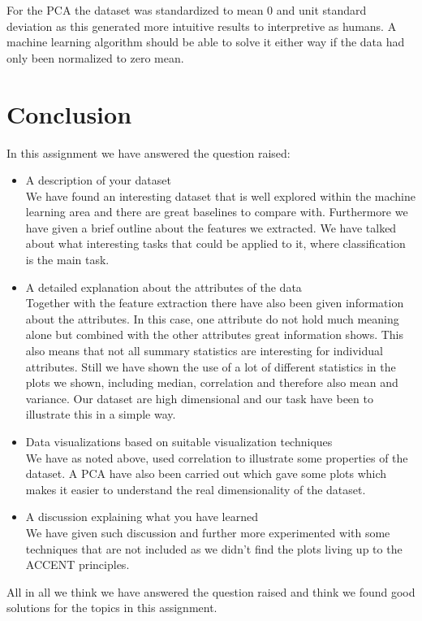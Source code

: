 For the PCA the dataset was standardized to mean 0 and unit standard deviation as this generated more intuitive results to interpretive as humans. A machine learning algorithm should be able to solve it either way if the data had only been normalized to zero mean. 

\section{Conclusion}

In this assignment we have answered the question raised:
\begin{itemize}
\item A description of your dataset\\ We have found an interesting dataset that is well explored within the machine learning area and there are great baselines to compare with. Furthermore we have given a brief outline about the features we extracted. We have talked about what interesting tasks that could be applied to it, where classification is the main task.
\item A detailed explanation about the attributes of the data\\
Together with the feature extraction there have also been given information about the attributes. In this case, one attribute do not hold much meaning alone but combined with the other attributes great information shows. This also means that not all summary statistics are interesting for individual attributes. Still we have shown the use of a lot of different statistics in the plots we shown, including median, correlation and therefore also mean and variance. Our dataset are high dimensional and our task have been to illustrate this in a simple way.
\item Data visualizations based on suitable visualization techniques\\ We have as noted above, used correlation to illustrate some properties of the dataset. A PCA have also been carried out which gave some plots which makes it easier to understand the real dimensionality of the dataset.
\item A discussion explaining what you have learned\\ We have given such discussion and further more experimented with some techniques that are not included as we didn’t find the plots living up to the ACCENT principles.
\end{itemize}

All in all we think we have answered the question raised and think we found good solutions for the topics in this assignment.

